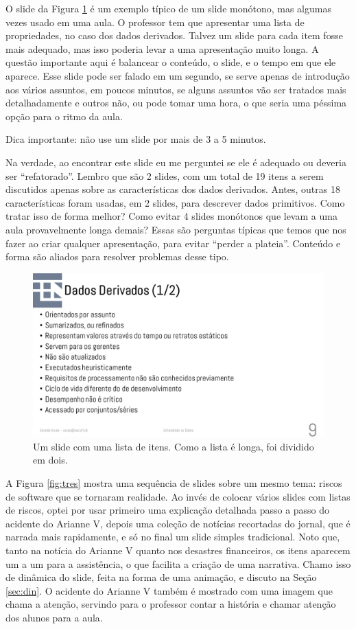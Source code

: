 O slide da Figura \ref{fig:dados} é um exemplo típico de um slide monótono, mas algumas vezes usado em uma aula.
O professor tem que apresentar uma lista de propriedades, no caso dos dados derivados.
Talvez um slide para cada item fosse mais adequado, mas isso poderia levar a uma apresentação muito longa.
A questão importante aqui é balancear o conteúdo, o slide, e o tempo em que ele aparece.
Esse slide pode ser falado em um segundo, se serve apenas de introdução aos vários assuntos, em poucos minutos, se alguns assuntos vão ser tratados mais detalhadamente e outros não, ou pode tomar uma hora, o que seria uma péssima opção para o ritmo da aula.

Dica importante: não use um slide por mais de 3 a 5 minutos.

Na verdade, ao encontrar este slide eu me perguntei se ele é adequado ou deveria ser ``refatorado''.
Lembro que são 2 slides, com um total de 19 itens a serem discutidos apenas sobre as características dos dados derivados.
 Antes, outras 18 características foram usadas, em 2 slides, para descrever dados primitivos.
  Como tratar isso de forma melhor? Como evitar 4 slides monótonos que levam a uma aula provavelmente longa demais?
  Essas são perguntas típicas que temos que nos fazer ao criar qualquer apresentação, para evitar ``perder a plateia''. Conteúdo e forma são aliados para resolver problemas desse tipo.

\begin{figure}[tbh]
    \centering
    \includegraphics[width=\tam\linewidth,frame]{imagens/dados}
    \caption{Um slide com uma lista de itens. Como a lista é longa, foi dividido em dois.}
    \label{fig:dados}
\end{figure}


A Figura \ref{fig:tres} mostra uma sequência de slides sobre um mesmo tema: riscos de software que se tornaram realidade. Ao invés de colocar vários slides com listas de riscos, optei por usar primeiro uma explicação detalhada passo a passo do acidente do Arianne V, depois uma coleção de notícias recortadas do jornal, que é narrada mais rapidamente, e só no final um slide simples tradicional.
 Noto que, tanto na notícia do Arianne V quanto nos desastres financeiros, os itens aparecem um a um para a assistência, o que facilita a criação de uma narrativa.
  Chamo isso de dinâmica do slide, feita na forma de uma animação, e discuto na Seção \ref{sec:din}.
   O acidente do Arianne V também é mostrado com uma imagem que chama a atenção, servindo para o professor contar a história e chamar atenção dos alunos para a aula.

